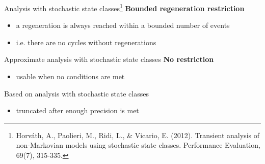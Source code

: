   \begin{frame}{Analysis with stochastic state classes\footnote{Horváth, A., Paolieri, M., Ridi, L., \& Vicario, E. (2012). Transient analysis of non-Markovian models using stochastic state classes. Performance Evaluation, 69(7), 315-335.}}
    \textbf{Bounded regeneration restriction}
    \begin{itemize}
      \item a regeneration is always reached within a bounded number of events
      \item i.e. there are no cycles without regenerations
    \end{itemize}
    
    \vspace{1em}
    \begin{center}\scalebox{0.8}{}\end{center}
  \end{frame}
  
  \begin{frame}{Approximate analysis with stochastic state classes}
    \textbf{No restriction}
    \begin{itemize}
      \item usable when no conditions are met
    \end{itemize}
    
     \vspace{1em}
    Based on analysis with stochastic state classes
    \begin{itemize}
      \item truncated after enough precision is met
    \end{itemize}
    
    \vspace{1em}
    \begin{center}\scalebox{0.8}{}\end{center}
  \end{frame}

